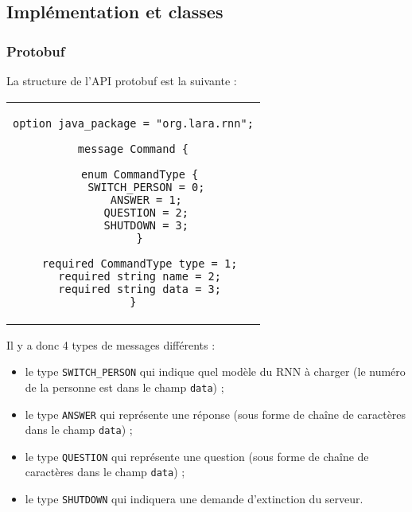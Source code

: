 \documentclass[10pt,a4paper]{article}
\begin{document}
\subsection{Implémentation et classes}
\subsubsection{Protobuf}
La structure de l'API protobuf est la suivante :
\begin{center}
\begin{tabular}{c}
\begin{lstlisting}
option java_package = "org.lara.rnn";

message Command {

  enum CommandType {
    SWITCH_PERSON = 0;
    ANSWER = 1;
    QUESTION = 2;
    SHUTDOWN = 3;
  }

  required CommandType type = 1;
  required string name = 2;
  required string data = 3;
}
\end{lstlisting}
\end{tabular}
\end{center}
Il y a donc 4 types de messages différents :
\begin{itemize}
\item le type \texttt{SWITCH\_PERSON} qui indique quel modèle du RNN à charger (le numéro de la personne est dans le champ \texttt{data}) ;
\item le type \texttt{ANSWER} qui représente une réponse (sous forme de chaîne de caractères dans le champ \texttt{data}) ;
\item le type \texttt{QUESTION} qui représente une question (sous forme de chaîne de caractères dans le champ \texttt{data}) ;
\item le type \texttt{SHUTDOWN} qui indiquera une demande d'extinction du serveur.
\end{itemize}
\end{document}
